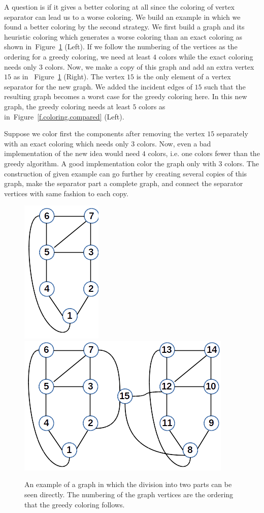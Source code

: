 \documentclass[12pt, twoside,a4paper,toc=bibliography]{scrbook}
\newcommand{\figref}[1]{Figure~\protect\ref{#1}}
\begin{document}
A question is if it gives a better coloring at all since the coloring of vertex separator
can lead us to a worse coloring.
We build an example in which we found a better coloring by the second strategy.
We first build a graph and its heuristic coloring which generates a worse coloring
than an exact coloring as shown in~\figref{f.coloring.graph} (Left). If we follow
the numbering of the vertices as the ordering for a greedy coloring, we need
at least $4$ colors while the exact coloring needs only $3$ colors.
Now, we make a copy of this graph and add an extra vertex $15$ as in
~\figref{f.coloring.graph} (Right). The vertex $15$ is the only element of
a vertex separator for the new graph. We added the incident edges of $15$ such that
the resulting graph becomes a worst case for the greedy coloring here.
In this new graph, the greedy coloring needs at least $5$ colors
as in~\figref{f.coloring.compared} (Left).

Suppose we color first the components after removing the vertex $15$ separately with
an exact coloring which needs only $3$ colors. Now, even a bad implementation of the
new idea would need $4$ colors, i.e. one colors fewer than the greedy algorithm.
A good implementation color the graph only with $3$ colors.
The construction of given example can go further by creating several copies of 
this graph, make the separator part a complete graph, and connect the separator vertices
with same fashion to each copy.
\begin{figure}
\centering
\includegraphics[width=0.18\linewidth]{coloring0}
\hfill
\includegraphics[width=0.48\linewidth]{coloring1}
\caption{
An example of a graph in which the division into two parts can be seen directly.
The numbering of the graph vertices are the ordering that the greedy coloring follows.
}
\label{f.coloring.graph}
\end{figure}
\end{document}
